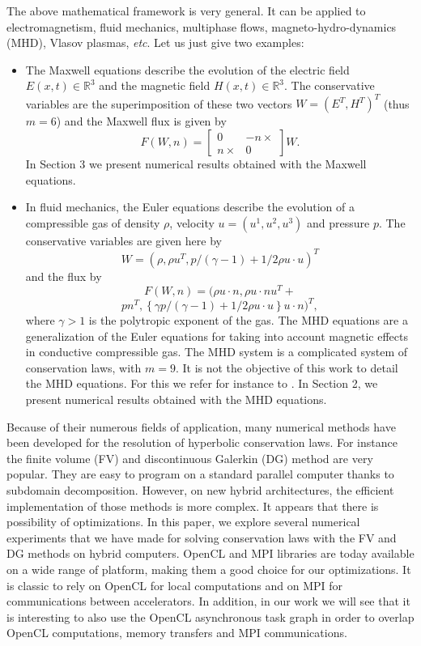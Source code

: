 \documentclass[preprint]{sig-alternate}
\begin{document}
The above mathematical framework is very general. It can be applied  to electromagnetism, fluid mechanics, multiphase flows, magneto-hydro-dynamics (MHD), Vlasov plasmas, \emph{etc}. Let us just give two examples:
\begin{itemize}
\item The Maxwell equations describe the evolution of the electric field $E(x,t)\in \mathbb{R}^3$ and the magnetic field $H(x,t)\in \mathbb{R}^3$. The conservative variables are the superimposition of these two vectors $W=(E^T,H^T)^T$ (thus $m=6$) and the Maxwell flux is given by $$F(W,n)=\left[\begin{array}{cc}
0 & -n\times\\
n\times & 0
\end{array}\right]W. $$
In Section 3 we present numerical results obtained with the Maxwell equations.
\item In fluid mechanics, the Euler equations describe the evolution of a compressible gas of density $\rho$, velocity $u=(u^1,u^2,u^3)$ and pressure $p$. The conservative variables are given here by $$W=(\rho,\rho u^T,p/(\gamma-1)+1/2 \rho u\cdot u)^T$$ and the flux by $$ F(W,n)=(\rho u \cdot n, \rho u\cdot n u^T + $$ $$p n^T,\left\{ \gamma p/(\gamma-1)+1/2 \rho u\cdot u \right\} u\cdot n)^T,$$where $\gamma>1$ is the polytropic exponent of the gas. The MHD equations are a generalization of the Euler equations for taking into account magnetic effects in conductive compressible gas. The MHD system is a complicated system of conservation laws, with $m=9$. It is not the objective of this work to detail the MHD equations. For this we refer for instance to \cite{massaro2014numerical}. In Section 2, we present numerical results obtained with the MHD equations.
\end{itemize}

Because of their numerous fields of application, many numerical methods have been developed for the resolution of hyperbolic conservation laws. For instance the finite volume (FV) and discontinuous Galerkin (DG) method are very popular. They are easy to program on a standard parallel computer thanks to subdomain decomposition. However, on new hybrid architectures, the efficient implementation of those methods is more complex. It appears that there is possibility of optimizations. In this paper, we explore several numerical experiments that we have made for solving conservation laws with the FV and DG methods on hybrid computers. OpenCL and MPI libraries are today available on a wide range of platform, making them a good choice for our optimizations.
It is classic to rely on OpenCL for local computations and on MPI for communications between accelerators. In addition, in our work we will see that it is interesting to also use the OpenCL asynchronous task graph in order to overlap OpenCL computations, memory transfers and MPI communications.
\end{document}
